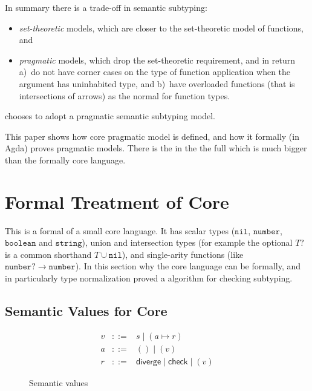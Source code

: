 \documentclass[acmsmall,review,screen]{acmart}
\newcommand{\NIL}{\mathtt{nil}}
\newcommand{\BOOLEAN}{\mathtt{boolean}}
\newcommand{\NUMBER}{\mathtt{number}}
\newcommand{\STRING}{\mathtt{string}}
\newcommand{\DIVERGE}{\mathsf{diverge}}
\newcommand{\CHECK}{\mathsf{check}}
\newcommand{\fun}{\mathbin{\rightarrow}}
\begin{document}
In summary there is a trade-off in semantic subtyping:
\begin{itemize}
  
\item \emph{set-theoretic} models, which are closer to the set-theoretic model
  of functions, and

\item \emph{pragmatic} models, which drop the set-theoretic requirement, and in return
  a)~do not have corner cases on the type of function application when the argument has uninhabited type, and
  b)~have overloaded functions (that is intersections of arrows) as the normal for function types.
  
\end{itemize}
 chooses to adopt a pragmatic semantic subtyping model.

This paper shows how core  pragmatic model is defined,
and how it formally (in Agda) proves pragmatic models.
There is the in the the full  which is much bigger than the formally core language.

\section{Formal Treatment of Core }

This is a formal of a small core language. It has scalar types
($\NIL$, $\NUMBER$, $\BOOLEAN$ and $\STRING$), union and intersection types
(for example the optional $T?$ is a common shorthand $T \cup \NIL$),
and single-arity functions (like $\NUMBER? \fun \NUMBER$).
In this section why the core language can be formally, and in particularly
type normalization proved a algorithm for checking subtyping.

\subsection{Semantic Values for Core }

\begin{figure}
  
\[\begin{array}{rcl}
  v & ::= & s \mid (a \mapsto r) \\
  a & ::= & () \mid (v) \\
  r & ::= & \DIVERGE \mid \CHECK \mid (v) 
\end{array}\]
\caption{Semantic values}
\label{fig:semval}

\end{figure}
\end{document}
